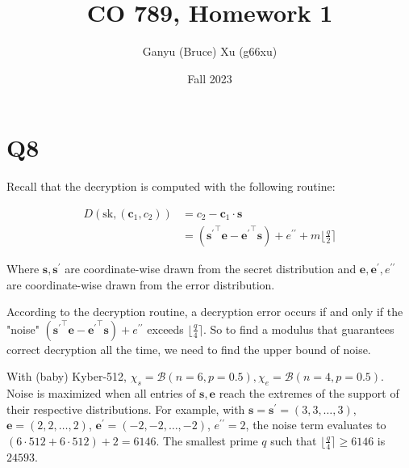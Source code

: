 \documentclass{article}
\title{CO 789, Homework 1}
\author{Ganyu (Bruce) Xu (g66xu)}
\date{Fall 2023}
\newcommand{\round}[1]{\lfloor {#1} \rceil}
\begin{document}

\section*{Q8}
Recall that the decryption is computed with the following routine:

$$
\begin{aligned}
D(\text{sk}, (\mathbf{c}_1, c_2))
&= c_2 - \mathbf{c}_1 \cdot \mathbf{s} \\
&= ({\mathbf{s}^\prime}^\intercal\mathbf{e} - {\mathbf{e}^\prime}^\intercal\mathbf{s}) + e^{\prime\prime} + m\round{\frac{q}{2}}
\end{aligned}
$$

Where $\mathbf{s}, \mathbf{s}^\prime$ are coordinate-wise drawn from the secret distribution and $\mathbf{e}, \mathbf{e}^\prime, e^{\prime\prime}$ are coordinate-wise drawn from the error distribution.

According to the decryption routine, a decryption error occurs if and only if the "noise" $({\mathbf{s}^\prime}^\intercal\mathbf{e} - {\mathbf{e}^\prime}^\intercal\mathbf{s}) + e^{\prime\prime}$ exceeds $\round{\frac{q}{4}}$. So to find a modulus that guarantees correct decryption all the time, we need to find the upper bound of noise.

With (baby) Kyber-512, $\chi_s = \mathcal{B}(n=6, p=0.5), \chi_e = \mathcal{B}(n=4, p=0.5)$. Noise is maximized when all entries of $\mathbf{s}, \mathbf{e}$ reach the extremes of the support of their respective distributions. For example, with $\mathbf{s} = \mathbf{s}^\prime = (3, 3, \ldots, 3)$, $\mathbf{e} = (2, 2, \ldots, 2)$, $\mathbf{e}^\prime = (-2, -2, \ldots, -2)$, $e^{\prime\prime} = 2$, the noise term evaluates to $(6 \cdot 512 + 6 \cdot 512) + 2 = 6146$. The smallest prime $q$ such that $\round{\frac{q}{4}} \geq 6146$ is $24593$.
\end{document}
